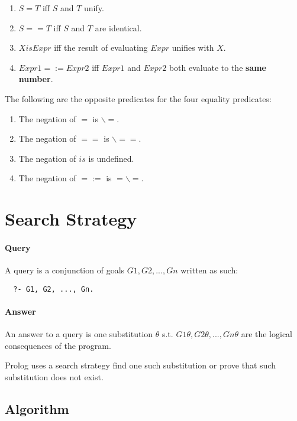 \documentclass{article}
\begin{document}
\begin{multicols}{2}
  \begin{enumerate}
  \item $S = T$ iff $S$ and $T$ unify.
  \item $S == T$ iff $S$ and $T$ are identical.
  \item $X is Expr$ iff the result of evaluating $Expr$ unifies with $X$.
  \item $Expr1 =:= Expr2$ iff $Expr1$ and $Expr2$ both evaluate to the {\bf same number}.
  \end{enumerate}
  
  The following are the opposite predicates for the four equality predicates:
  
  \begin{enumerate}
  \item The negation of $=$ is $\backslash=$.
  \item The negation of $==$ is $\backslash==$.
  \item The negation of $is$ is undefined.
  \item The negation of $=:=$ is $=\backslash=$.
  \end{enumerate}
  
  \section{Search Strategy}
  
  \paragraph{Query} A query is a conjunction of goals $G1, G2, ..., Gn$ written as such:
  
  \begin{lstlisting}
  ?- G1, G2, ..., Gn.
  \end{lstlisting}
  
  \paragraph{Answer} An answer to a query is one substitution $\theta$ s.t. $G1\theta, G2\theta, ..., Gn\theta$ are the logical consequences of the program.
  
  Prolog uses a search strategy find one such substitution or prove that such substitution does not exist.
  
  \subsection{Algorithm}
  

\end{multicols}
\end{document}
